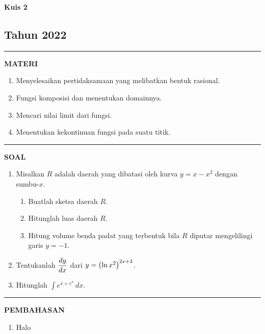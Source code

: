 \begin{flushright}
    \textbf{\Large{Kuis 2}}
    \subsection*{Tahun 2022}
\end{flushright}
\vspace{0.5cm}
\hrule height 2pt
\vspace{0.5cm}
\begin{center}
    \textbf{\large{MATERI}}
    \begin{enumerate}[leftmargin=*, label={\arabic*}.]
        \item Menyelesaikan pertidaksamaan yang melibatkan bentuk rasional.
        \item Fungsi komposisi dan menentukan domainnya.
        \item Mencari nilai limit dari fungsi.
        \item Menentukan kekontinuan fungsi pada suatu titik.
    \end{enumerate}
\end{center}
\vspace{0.2cm}
\hrule height 1pt
\vspace{0.5cm}
\begin{center}
    \textbf{\large{SOAL}}
\end{center}
\begin{enumerate}[leftmargin=*, label={\arabic*}.]
\item Misalkan $R$ adalah daerah yang dibatasi oleh kurva $y=x-x^{2}$ 
dengan sumbu-$x$.
\begin{enumerate}[label={\alph*}.]
    \item Buatlah sketsa daerah $R$.
    \item Hitunglah luas daerah $R$.
    \item Hitung volume benda padat yang terbentuk bila $R$ diputar 
    mengelilingi garis $y=-1$.
\end{enumerate}
\item Tentukanlah $\ds \frac{dy}{dx}$ dari $y=\brk*{\ln x^{2}}^{2x+3}$.
\item Hitunglah $\int e^{x+e^{x}}\,dx$.
\end{enumerate}
\vspace{0.2cm}
\hrule height 1pt
\vspace{0.5cm}

\begin{center}
    \textbf{\large{PEMBAHASAN}}
\end{center}
\begin{enumerate}[leftmargin=*, label={\arabic*}.]
\item Halo
\end{enumerate}
